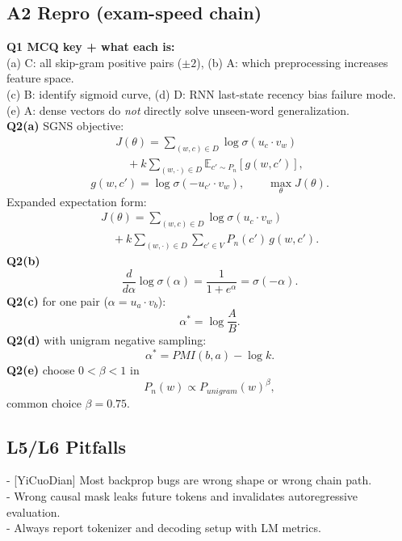 \subsection*{A2 Repro (exam-speed chain)}
\textbf{Q1 MCQ key + what each is:}\\
(a) C: all skip-gram positive pairs ($\pm2$), (b) A: which preprocessing increases feature space.\\
(c) B: identify sigmoid curve, (d) D: RNN last-state recency bias failure mode.\\
(e) A: dense vectors do \emph{not} directly solve unseen-word generalization.\\
\textbf{Q2(a)} SGNS objective:
\[
\begin{array}{l}
J(\theta)=
\sum_{(w,c)\in D}\log\sigma(u_c\cdot v_w)\\
\quad +k\sum_{(w,\cdot)\in D}\mathbb E_{c'\sim P_n}[g(w,c')],
\end{array}
\]
\[
g(w,c')=\log\sigma(-u_{c'}\cdot v_w),\qquad
\max_\theta J(\theta).
\]
Expanded expectation form:
\[
\begin{array}{l}
J(\theta)=
\sum_{(w,c)\in D}\log\sigma(u_c\cdot v_w)\\
\quad +k\sum_{(w,\cdot)\in D}\sum_{c'\in V}P_n(c')\,g(w,c').
\end{array}
\]
\textbf{Q2(b)}
\[
\frac{d}{d\alpha}\log\sigma(\alpha)=\frac{1}{1+e^{\alpha}}=\sigma(-\alpha).
\]
\textbf{Q2(c)} for one pair ($\alpha=u_a\cdot v_b$):
\[
\alpha^*=\log\frac{A}{B}.
\]
\textbf{Q2(d)} with unigram negative sampling:
\[
\alpha^*=PMI(b,a)-\log k.
\]
\textbf{Q2(e)} choose $0<\beta<1$ in
\[
P_n(w)\propto P_{unigram}(w)^\beta,
\]
common choice $\beta=0.75$.

\subsection*{L5/L6 Pitfalls}
- [YiCuoDian] Most backprop bugs are wrong shape or wrong chain path.\\
- Wrong causal mask leaks future tokens and invalidates autoregressive evaluation.\\
- Always report tokenizer and decoding setup with LM metrics.
